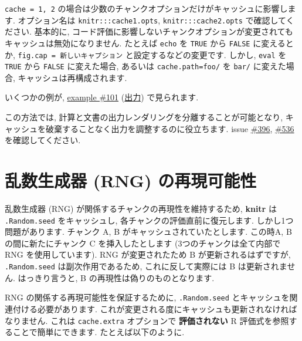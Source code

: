 \documentclass[
  lualatex,ja=standard,jafont=noto-otf]{bxjsreport}
\begin{document}
\texttt{cache\ =\ 1,\ 2}
の場合は少数のチャンクオプションだけがキャッシュに影響します.
オプション名は \texttt{knitr:::cache1.opts},
\texttt{knitr:::cache2.opts} で確認してください. 基本的に,
コード評価に影響しないチャンクオプションが変更されてもキャッシュは無効になりません.
たとえば \texttt{echo} を \texttt{TRUE} から \texttt{FALSE}
に変えるとか,
\texttt{fig.cap\ =\ \textquotesingle{}新しいキャプション\textquotesingle{}}
と設定するなどの変更です. しかし, \texttt{eval} を \texttt{TRUE} から
\texttt{FALSE} に変えた場合, あるいは
\texttt{cache.path=\textquotesingle{}foo/\textquotesingle{}} を
\texttt{\textquotesingle{}bar/\textquotesingle{}} に変えた場合,
キャッシュは再構成されます.

いくつかの例が, \href{https://github.com/yihui/knitr-examples/}{example
\#101}
(\href{https://github.com/yihui/knitr-examples/blob/master/101-cache-levels.md}{出力})
で見られます.

この方法では, 計算と文書の出力レンダリングを分離することが可能となり,
キャッシュを破棄することなく出力を調整するのに役立ちます. issue
\href{https://github.com/yihui/knitr/issues/396}{\#396},
\href{https://github.com/yihui/knitr/issues/536}{\#536}
を確認してください.

\hypertarget{ux4e71ux6570ux751fux6210ux5668-rng-ux306eux518dux73feux53efux80fdux6027}{%
\section*{乱数生成器 (RNG)
の再現可能性}\label{ux4e71ux6570ux751fux6210ux5668-rng-ux306eux518dux73feux53efux80fdux6027}}

乱数生成器 (RNG) が関係するチャンクの再現性を維持するため,
\textbf{knitr} は \texttt{.Random.seed} をキャッシュし,
各チャンクの評価直前に復元します. しかし1つ問題があります. チャンク A, B
がキャッシュされていたとします. この時A, B の間に新たにチャンク C
を挿入したとします (3つのチャンクは全て内部で RNG を使用しています). RNG
が変更されたため B が更新されるはずですが, \texttt{.Random.seed}
は副次作用であるため, これに反して実際には B は更新されません.
はっきり言うと, B の再現性は偽りのものとなります.

RNG の関係する再現可能性を保証するために, \texttt{.Random.seed}
とキャッシュを関連付ける必要があります.
これが変更される度にキャッシュも更新されなければなりません. これは
\texttt{cache.extra} オプションで \textbf{評価されない} R
評価式を参照することで簡単にできます. たとえば以下のように.
\end{document}

